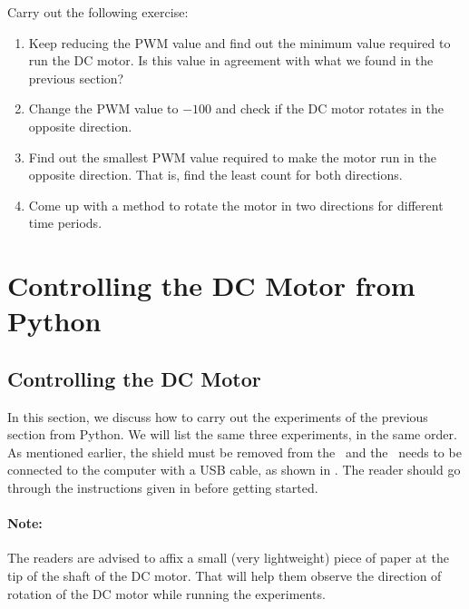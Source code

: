 \begin{exercise} 
  Carry out the following exercise:
  \begin{enumerate}
    \item Keep reducing the PWM value and find out the minimum value
          required to run the DC motor.  Is this value in agreement with what
          we found in the previous section?
    \item Change the PWM value to $-100$ and check if the DC motor rotates
          in the opposite direction.
    \item Find out the smallest PWM value required to make the motor run
          in the opposite direction.  That is, find the least count for both
          directions.
    \item Come up with a method to rotate the motor in two directions for
          different time periods.
  \end{enumerate}
\end{exercise}

\section{Controlling the DC Motor from Python}
\subsection{Controlling the DC Motor}
In this section, we discuss how to carry out the experiments of the
previous section from Python.  We will list the same three experiments,
in the same order. As mentioned earlier, the shield must be removed from 
the \arduino\ and the \arduino\ needs to be connected to the computer 
with a USB cable, as shown in . The reader should go through the instructions given in
 before getting started.

\paragraph{Note:} The readers are advised to affix a small 
(very lightweight) piece of paper at the tip of the shaft of the DC motor. 
That will help them observe the direction of rotation 
of the DC motor while running the experiments. 

